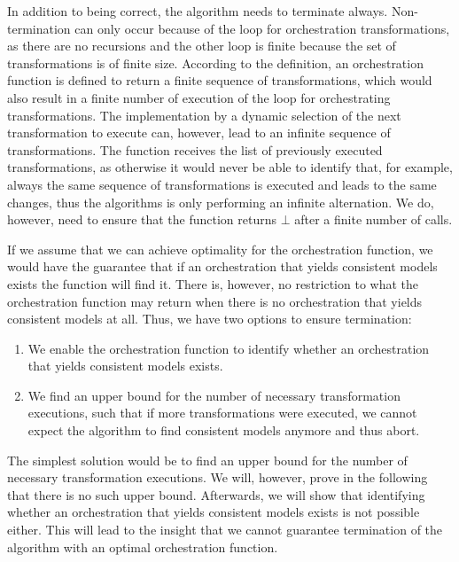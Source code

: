 In addition to being correct, the algorithm needs to terminate always.
Non-termination can only occur because of the loop for orchestration transformations, as there are no recursions and the other loop is finite because the set of transformations is of finite size.
According to the definition, an orchestration function is defined to return a finite sequence of transformations, which would also result in a finite number of execution of the loop for orchestrating transformations.
The implementation by a dynamic selection of the next transformation to execute can, however, lead to an infinite sequence of transformations.
The  function receives the list of previously executed transformations, as otherwise it would never be able to identify that, for example, always the same sequence of transformations is executed and leads to the same changes, thus the algorithms is only performing an infinite alternation.
We do, however, need to ensure that the  function returns $\bot$ after a finite number of calls.

If we assume that we can achieve optimality for the orchestration function, we would have the guarantee that if an orchestration that yields consistent models exists the function will find it.
There is, however, no restriction to what the orchestration function may return when there is no orchestration that yields consistent models at all.
Thus, we have two options to ensure termination:
\begin{enumerate}
    \item We enable the orchestration function to identify whether an orchestration that yields consistent models exists.
    \item We find an upper bound for the number of necessary transformation executions, such that if more transformations were executed, we cannot expect the algorithm to find consistent models anymore and thus abort. 
\end{enumerate}

The simplest solution would be to find an upper bound for the number of necessary transformation executions.
We will, however, prove in the following that there is no such upper bound.
Afterwards, we will show that identifying whether an orchestration that yields consistent models exists is not possible either.
This will lead to the insight that we cannot guarantee termination of the algorithm with an optimal orchestration function.


